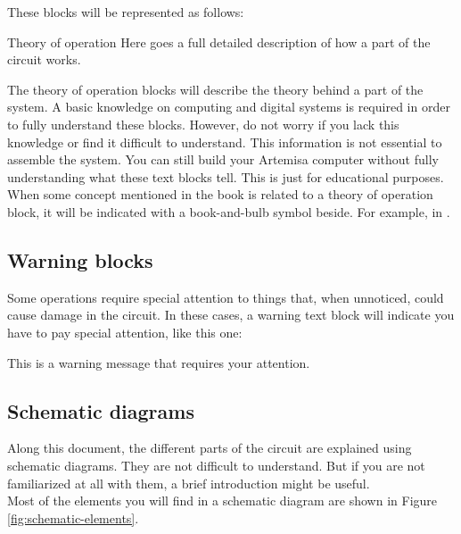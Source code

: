 These blocks will be represented as follows:\\

\begin{theory}[h!]{Theory of operation}
	Here goes a full detailed description of how a part of the circuit works. 	
\end{theory}

The theory of operation blocks will describe the theory behind a part of the system. A basic knowledge on computing and digital systems is required in order to fully understand these blocks. However, do not worry if you lack this knowledge or find it difficult to understand. This information is not essential to assemble the system. You can still build your Artemisa computer without fully understanding what these text blocks tell. This is just for educational purposes.\\

When some concept mentioned in the book is related to a theory of operation block, it will be indicated with a book-and-bulb symbol beside. For example, in .

\subsection{Warning blocks}

Some operations require special attention to things that, when unnoticed, could cause damage in the circuit. In these cases, a warning text block will indicate you have to pay special attention, like this one:\\

\begin{warning}
	This is a warning message that requires your attention.
\end{warning}

\subsection{Schematic diagrams}

Along this document, the different parts of the circuit are explained using schematic diagrams. They are not difficult to understand. But if you are not familiarized at all with them, a brief introduction might be useful. \\

Most of the elements you will find in a schematic diagram are shown in Figure \ref{fig:schematic-elements}.\\

